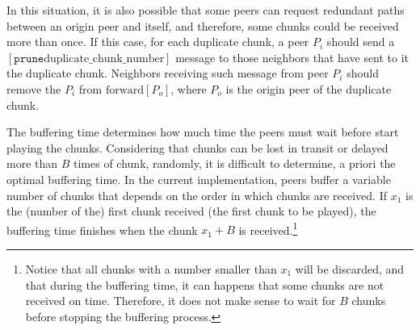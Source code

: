 In this situation, it is also possible that some peers can request
redundant paths between an origin peer and itself, and therefore, some
chunks could be received more than once. If this case, for each
duplicate chunk, a peer $P_i$ should send a $[\mathtt{prune}
  \text{duplicate\_chunk\_number}]$ message to those neighbors that
have sent to it the duplicate chunk. Neighbors receiving such message
from peer $P_i$ should remove the $P_i$ from $\text{forward}[P_o]$,
where $P_o$ is the origin peer of the duplicate chunk.

\begin{comment}
\begin{figure*}
  \fig{500}{5cm}{DBS_peer_buffering} \caption{Buffering of the
    chunks.\label{fig:DBS_peer_buffering}}
\end{figure*}
\end{comment}

The buffering time determines how much time the peers must wait before
start playing the chunks. Considering that chunks can be lost in
transit or delayed more than $B$ times of chunk, randomly, it is
difficult to determine, a priori the optimal buffering time. In the
current implementation, peers buffer a variable number of chunks that
depends on the order in which chunks are received. If $x_1$ is the
(number of the) first chunk received (the first chunk to be played),
the buffering time finishes when the chunk $x_1+B$ is
received.\footnote{Notice that all chunks with a number smaller than
  $x_1$ will be discarded, and that during the buffering time, it can
  happens that some chunks are not received on time. Therefore, it
  does not make sense to wait for $B$ chunks before stopping the
  buffering process.}


\begin{comment}
An heuristic that
works is the described in the Fig.~\ref{fig:DBS_peer_buffering}. As
can be seen, $\text{chunk\_to\_play}$ points to the first received
chunk, that not necessary is the received chunk with lower
index. After that, the
buffering finishes when a chunk with index $\text{chunk\_to\_play} +
\text{BUFFER\_SIZE}/2$ has been received.\footnote{This not means that
  $\text{BUFFER\_SIZE}/2$ chunks are available in the buffer.}
\end{comment}
